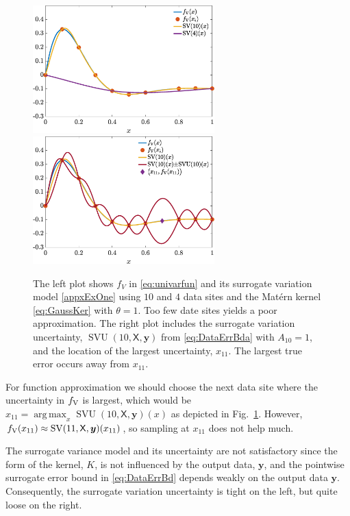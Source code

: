 \documentclass[11pt]{NSFamsart}
\DeclareMathOperator*{\argmax}{arg\,max}
\DeclareMathOperator{\SVAR}{SV} %
\DeclareMathOperator{\SVARERR}{SVU} %
\newcommand{\VAR}{\textup{V}}
\newcommand{\mX}{\mathsf{X}}
\newcommand{\by}{{\boldsymbol{y}}}
\begin{document}
\begin{figure}[ht]
\centering
\includegraphics[width = 7cm]{ProgramsImages/fandDataAndAppxSmall.eps} \qquad \qquad
\includegraphics[width = 7cm]{ProgramsImages/fandDataAndAppxAndRMSPE.eps}
\caption{The left plot shows $f_V$ in \eqref{eq:univarfun} and its surrogate variation model \eqref{appxExOne} using $10$ and $4$ data sites and the Mat\'ern kernel \eqref{eq:GaussKer} with $\theta = 1$. Too few date sites yields a poor approximation. The right plot includes the surrogate variation uncertainty, $\SVARERR(10,\mX,\by)$ from \eqref{eq:DataErrBda} with $A_{10} =1$, and the location of the largest uncertainty, $x_{11}$. The largest true error occurs away from $x_{11}$.}
\label{fig:sampleFun}
\end{figure}

For function approximation we should choose the next data site where the uncertainty in $f_{\VAR}$ is largest, which would be $x_{11} = \argmax_x \SVARERR(10,\mX,\by)(x)$ as depicted in Fig.\ \ref{fig:sampleFun}. However, $f_{\VAR}(x_{11}) \approx \SVAR(11,\mX,\by)(x_{11})$, so sampling at $x_{11}$ does not help much.

The surrogate variance model and its uncertainty are not satisfactory since the form of the kernel, $K$, is not influenced by the output data, $\by$, and the pointwise surrogate error bound in \eqref{eq:DataErrBd} depends weakly on the output data $\by$. Consequently, the surrogate variation uncertainty is tight on the left, but quite loose on the right. 
\end{document}
